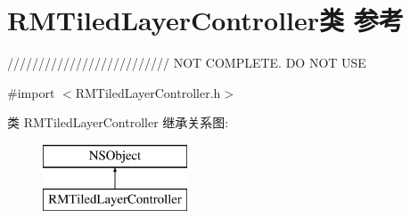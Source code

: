 \hypertarget{interface_r_m_tiled_layer_controller}{\section{R\-M\-Tiled\-Layer\-Controller类 参考}
\label{interface_r_m_tiled_layer_controller}
}


////////////////////////// N\-O\-T C\-O\-M\-P\-L\-E\-T\-E. D\-O N\-O\-T U\-S\-E  




{\ttfamily \#import $<$R\-M\-Tiled\-Layer\-Controller.\-h$>$}

类 R\-M\-Tiled\-Layer\-Controller 继承关系图\-:\begin{figure}[H]
\begin{center}
\leavevmode
\includegraphics[height=2.000000cm]{interface_r_m_tiled_layer_controller}
\end{center}
\end{figure}
